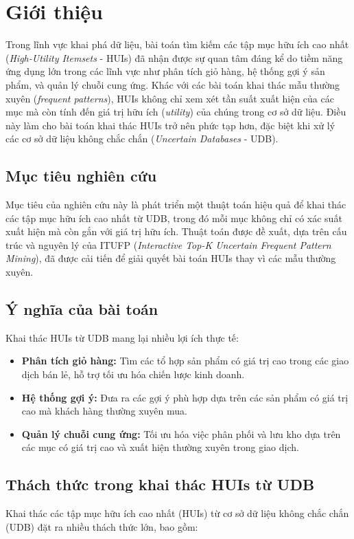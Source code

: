 \documentclass[conference]{IEEEtran}
\begin{document}
\section{Giới thiệu}
Trong lĩnh vực khai phá dữ liệu, bài toán tìm kiếm các tập mục hữu ích cao nhất (\textit{High-Utility Itemsets} - HUIs) đã nhận được sự quan tâm đáng kể do tiềm năng ứng dụng lớn trong các lĩnh vực như phân tích giỏ hàng, hệ thống gợi ý sản phẩm, và quản lý chuỗi cung ứng. Khác với các bài toán khai thác mẫu thường xuyên (\textit{frequent patterns}), HUIs không chỉ xem xét tần suất xuất hiện của các mục mà còn tính đến giá trị hữu ích (\textit{utility}) của chúng trong cơ sở dữ liệu. Điều này làm cho bài toán khai thác HUIs trở nên phức tạp hơn, đặc biệt khi xử lý các cơ sở dữ liệu không chắc chắn (\textit{Uncertain Databases} - UDB).

\subsection{Mục tiêu nghiên cứu}
Mục tiêu của nghiên cứu này là phát triển một thuật toán hiệu quả để khai thác các tập mục hữu ích cao nhất từ UDB, trong đó mỗi mục không chỉ có xác suất xuất hiện mà còn gắn với giá trị hữu ích. Thuật toán được đề xuất, dựa trên cấu trúc và nguyên lý của ITUFP (\textit{Interactive Top-K Uncertain Frequent Pattern Mining}), đã được cải tiến để giải quyết bài toán HUIs thay vì các mẫu thường xuyên.

\subsection{Ý nghĩa của bài toán}
Khai thác HUIs từ UDB mang lại nhiều lợi ích thực tế:
\begin{itemize}
    \item \textbf{Phân tích giỏ hàng:} Tìm các tổ hợp sản phẩm có giá trị cao trong các giao dịch bán lẻ, hỗ trợ tối ưu hóa chiến lược kinh doanh.
    \item \textbf{Hệ thống gợi ý:} Đưa ra các gợi ý phù hợp dựa trên các sản phẩm có giá trị cao mà khách hàng thường xuyên mua.
    \item \textbf{Quản lý chuỗi cung ứng:} Tối ưu hóa việc phân phối và lưu kho dựa trên các mục có giá trị cao và xuất hiện thường xuyên trong giao dịch.
\end{itemize}

\subsection{Thách thức trong khai thác HUIs từ UDB}
Khai thác các tập mục hữu ích cao nhất (HUIs) từ cơ sở dữ liệu không chắc chắn (UDB) đặt ra nhiều thách thức lớn, bao gồm:
\end{document}
